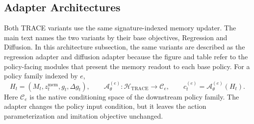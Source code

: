 \documentclass{article}
\begin{document}
\subsection{Adapter Architectures}
\label{app:adapter_architectures}
\label{app:runtime_latency}

Both TRACE variants use the same signature-indexed memory updater. The main text names the two variants by their base objectives, Regression and Diffusion. In this architecture subsection, the same variants are described as the regression adapter and diffusion adapter because the figure and table refer to the policy-facing modules that present the memory readout to each base policy. For a policy family indexed by $e$,
\begin{equation}
    H_t=(M_t,z_t^{\mathrm{mem}},g_t,\Delta g_t),
    \qquad
    \mathcal{A}^{(e)}_{\theta}:\mathcal{H}_{\mathrm{TRACE}}\rightarrow\mathcal{C}_e,
    \qquad
    c_t^{(e)}=\mathcal{A}^{(e)}_{\theta}(H_t).
    \label{eq:adapter_interface}
\end{equation}
Here $\mathcal{C}_e$ is the native conditioning space of the downstream policy family. The adapter changes the policy input condition, but it leaves the action parameterization and imitation objective unchanged.
\end{document}
